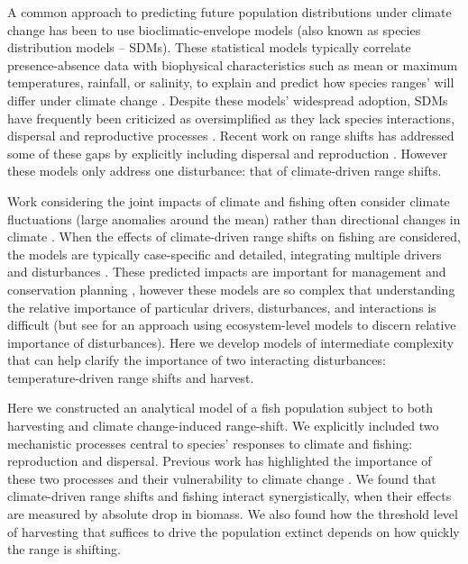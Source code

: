 \documentclass[12pt,english]{article}
\begin{document}
A common approach to predicting future population distributions under climate change has been to use bioclimatic-envelope models (also known as species distribution models -- SDMs). These statistical models typically correlate presence-absence data with biophysical characteristics such as mean or maximum temperatures, rainfall, or salinity, to explain and predict how species ranges' will differ under climate change \citep{Elithetal2006, GuisanThuiller2005, GuisanZimmerman2000}. Despite these models' widespread adoption, SDMs have frequently been criticized as oversimplified as they lack species interactions, dispersal and reproductive processes \citep{KearneyPorter2009, Zarnetskeetal2012, Robinsonetal2011}.  Recent work on range shifts has addressed some of these gaps by explicitly including dispersal and reproduction \citep{Berestyckietal2009, ZhouKot2011}. However these models only address one disturbance: that of climate-driven range shifts. 

Work considering the joint impacts of climate and fishing often consider climate fluctuations (large anomalies around the mean) rather than directional changes in climate \citep{WaltersParma1996, KingMcFarlane2006}. When the effects of climate-driven range shifts on fishing are considered, the models are typically case-specific and detailed, integrating multiple drivers and disturbances \citep{Cheungetal2010, Lindegrenetal2010, Brownetal2010, Merinoetal2010, Merinoetal2010b, Plaganyietal2011, Ainsworthetal2011, Zhangetal2011, Barangeetal2011, Howardetal2013}. These predicted impacts are important for management and conservation planning \citep{Allisonetal2009}, however these models are so complex that understanding the relative importance of particular drivers, disturbances, and interactions is difficult (but see \citet{Nyeetal2013} for an approach using ecosystem-level models to discern relative importance of disturbances). Here we develop models of intermediate complexity \citep[sensu][]{Gaylordetal2005} that can help clarify the importance of two interacting disturbances: temperature-driven range shifts and harvest. 

Here we constructed an analytical model of a fish population subject to both harvesting and climate change-induced range-shift. We explicitly included two mechanistic processes central to species' responses to climate and fishing: reproduction and dispersal. Previous work has highlighted the importance of these two processes and their vulnerability to climate change \citep{Fordhametal2013, Hastingsetal2005}.  We found that climate-driven range shifts and fishing interact synergistically, when their effects are measured by absolute drop in biomass.  We also found how the threshold level of harvesting that suffices to drive the population extinct depends on how quickly the range is shifting.
\end{document}
